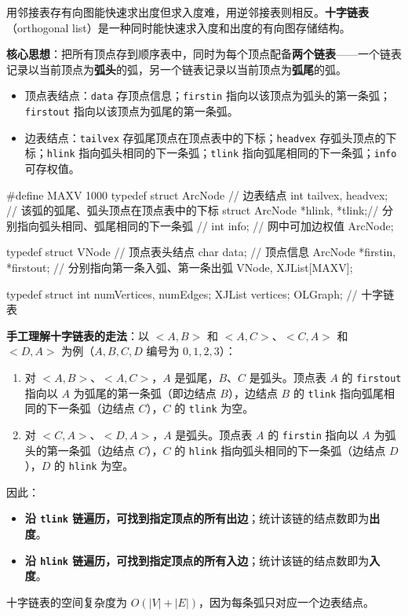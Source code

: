 \documentclass[11pt,openany,UTF8]{ctexbook}
\begin{document}
用邻接表存有向图能快速求出度但求入度难，用逆邻接表则相反。\textbf{十字链表}（orthogonal list）是一种同时能快速求入度和出度的有向图存储结构。

\textbf{核心思想}：把所有顶点存到顺序表中，同时为每个顶点配备\textbf{两个链表}——一个链表记录以当前顶点为\textbf{弧头}的弧，另一个链表记录以当前顶点为\textbf{弧尾}的弧。

\begin{itemize}
\item 顶点表结点：\texttt{data} 存顶点信息；\texttt{firstin} 指向以该顶点为弧头的第一条弧；\texttt{firstout} 指向以该顶点为弧尾的第一条弧。
\item 边表结点：\texttt{tailvex} 存弧尾顶点在顶点表中的下标；\texttt{headvex} 存弧头顶点的下标；\texttt{hlink} 指向弧头相同的下一条弧；\texttt{tlink} 指向弧尾相同的下一条弧；\texttt{info} 可存权值。
\end{itemize}
\begin{codebox}
#define MAXV 1000
typedef struct ArcNode {          // 边表结点
    int tailvex, headvex;         // 该弧的弧尾、弧头顶点在顶点表中的下标
    struct ArcNode *hlink, *tlink;// 分别指向弧头相同、弧尾相同的下一条弧
    // int info;                  // 网中可加边权值
} ArcNode;

typedef struct VNode {            // 顶点表头结点
    char data;                    // 顶点信息
    ArcNode *firstin, *firstout;  // 分别指向第一条入弧、第一条出弧
} VNode, XJList[MAXV];

typedef struct {
    int numVertices, numEdges;
    XJList vertices;
} OLGraph;                        // 十字链表
\end{codebox}

\textbf{手工理解十字链表的走法}：以 $<A,B>$ 和 $<A,C>$、$<C,A>$ 和 $<D,A>$ 为例（$A,B,C,D$ 编号为 $0,1,2,3$）：

\begin{enumerate}
\item 对 $<A,B>$、$<A,C>$，$A$ 是弧尾，$B$、$C$ 是弧头。顶点表 $A$ 的 \texttt{firstout} 指向以 $A$ 为弧尾的第一条弧（即边结点 $B$），边结点 $B$ 的 \texttt{tlink} 指向弧尾相同的下一条弧（边结点 $C$），$C$ 的 \texttt{tlink} 为空。
\item 对 $<C,A>$、$<D,A>$，$A$ 是弧头。顶点表 $A$ 的 \texttt{firstin} 指向以 $A$ 为弧头的第一条弧（边结点 $C$），$C$ 的 \texttt{hlink} 指向弧头相同的下一条弧（边结点 $D$），$D$ 的 \texttt{hlink} 为空。
\end{enumerate}
因此：

\begin{itemize}
\item \textbf{沿 \texttt{tlink} 链遍历，可找到指定顶点的所有出边}；统计该链的结点数即为\textbf{出度}。
\item \textbf{沿 \texttt{hlink} 链遍历，可找到指定顶点的所有入边}；统计该链的结点数即为\textbf{入度}。
\end{itemize}
十字链表的空间复杂度为 $O(|V|+|E|)$，因为每条弧只对应一个边表结点。
\end{document}
